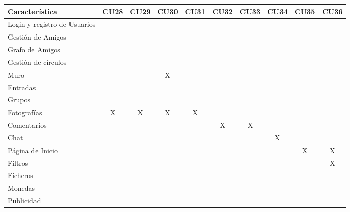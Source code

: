 \documentclass[12pt, a4paper, titlepage]{article}
\begin{document}
\begin{center}

\begin{tabular}{|p{3cm}|c|c|c|c|c|c|c|c|c|}
\hline 
\textbf{Característica} & CU28 & CU29  & CU30 & CU31 & CU32 & CU33 & CU34 & CU35 & CU36 \\ 
\hline 
Login y registro de Usuarios&   &    &   &   &   &   &   &   &   \\ 
\hline 
Gestión de Amigos &   &    &   &   &   &   &   &   &   \\ 
\hline 
Grafo de Amigos&   &    &   &   &   &   &   &   &   \\ 
\hline 
Gestión de círculos&   &    &   &   &   &   &   &   &   \\ 
\hline 
Muro&   &    & X  &   &   &   &   &   &   \\ 
\hline 
Entradas&   &    &   &   &   &   &   &   &   \\ 
\hline 
Grupos &    &    &  &   &   &   &   &   &   \\ 
\hline 
Fotografías & X  &   X & X  &  X &   &   &   &   &   \\ 
\hline 
Comentarios &   &    &   &   &  X & X  &   &   &   \\ 
\hline 
Chat&   &    &   &   &   &   & X  &   &   \\ 
\hline 
Página de Inicio &   &    &   &   &   &   &   & X  & X  \\ 
\hline 
Filtros &   &    &   &   &   &   &   &   &  X \\ 
\hline 
Ficheros &   &    &   &   &   &   &   &   &   \\  
\hline 
Monedas &   &    &   &   &   &   &   &   &   \\ 
\hline 
Publicidad &   &    &   &   &   &   &   &   &   \\ 
\hline  
\end{tabular} 
\end{center}
\end{document}
